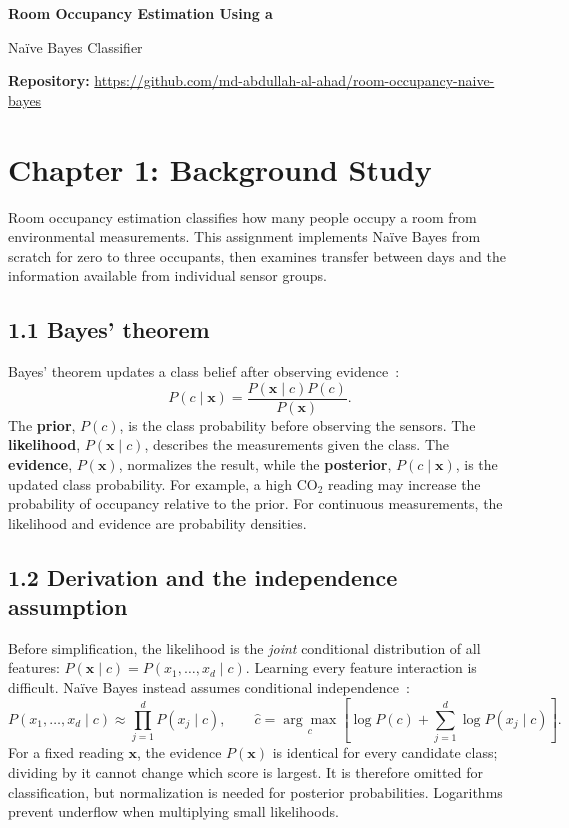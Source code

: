 \documentclass[12pt,a4paper]{article}
\begin{document}
\tableofcontents
\clearpage
{}

\begin{center}
{\fontsize{18}{22}\selectfont\bfseries\color{Navy} Room Occupancy Estimation Using a\par Na\"ive Bayes Classifier}\par
\vspace{6pt}
{\fontsize{10}{12}\selectfont\textbf{Repository:} \url{https://github.com/md-abdullah-al-ahad/room-occupancy-naive-bayes}}\par
\end{center}

\section{Chapter 1: Background Study}
Room occupancy estimation classifies how many people occupy a room from environmental measurements. This assignment implements Na\"ive Bayes from scratch for zero to three occupants, then examines transfer between days and the information available from individual sensor groups.

\subsection{1.1 Bayes' theorem}
Bayes' theorem updates a class belief after observing evidence~\cite[Sec.~2.2.3]{murphy}:
\begin{equation}
P(c\mid\mathbf{x})=\frac{P(\mathbf{x}\mid c)P(c)}{P(\mathbf{x})}.
\end{equation}
The \textbf{prior}, $P(c)$, is the class probability before observing the sensors. The \textbf{likelihood}, $P(\mathbf{x}\mid c)$, describes the measurements given the class. The \textbf{evidence}, $P(\mathbf{x})$, normalizes the result, while the \textbf{posterior}, $P(c\mid\mathbf{x})$, is the updated class probability. For example, a high CO$_2$ reading may increase the probability of occupancy relative to the prior. For continuous measurements, the likelihood and evidence are probability densities.

\subsection{1.2 Derivation and the independence assumption}
Before simplification, the likelihood is the \emph{joint} conditional distribution of all features: $P(\mathbf{x}\mid c)=P(x_1,\ldots,x_d\mid c)$. Learning every feature interaction is difficult. Na\"ive Bayes instead assumes conditional independence~\cite[Sec.~3.5]{murphy}:
\begin{equation}
P(x_1,\ldots,x_d\mid c)\approx\prod_{j=1}^{d}P(x_j\mid c),\qquad
\hat c=\underset{c}{\arg\max}\left[\log P(c)+\sum_{j=1}^{d}\log P(x_j\mid c)\right].
\label{eq:decision}
\end{equation}
For a fixed reading $\mathbf{x}$, the evidence $P(\mathbf{x})$ is identical for every candidate class; dividing by it cannot change which score is largest. It is therefore omitted for classification, but normalization is needed for posterior probabilities. Logarithms prevent underflow when multiplying small likelihoods.
\end{document}
